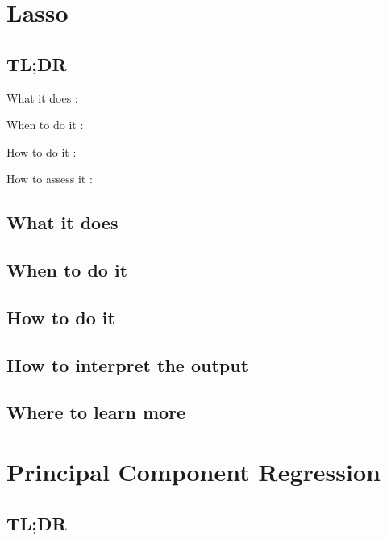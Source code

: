 \documentclass[
]{book}
\begin{document}
\hypertarget{lasso}{%
\chapter{Lasso}\label{lasso}}

\hypertarget{tldr-14}{%
\section{TL;DR}\label{tldr-14}}

What it does
:

When to do it
:

How to do it
:

How to assess it
:

\hypertarget{what-it-does-14}{%
\section{What it does}\label{what-it-does-14}}

\hypertarget{when-to-do-it-14}{%
\section{When to do it}\label{when-to-do-it-14}}

\hypertarget{how-to-do-it-14}{%
\section{How to do it}\label{how-to-do-it-14}}

\hypertarget{how-to-interpret-the-output-14}{%
\section{How to interpret the output}\label{how-to-interpret-the-output-14}}

\hypertarget{where-to-learn-more-14}{%
\section{Where to learn more}\label{where-to-learn-more-14}}

\hypertarget{principal-component-regression}{%
\chapter{Principal Component Regression}\label{principal-component-regression}}

\hypertarget{tldr-15}{%
\section{TL;DR}\label{tldr-15}}
\end{document}
